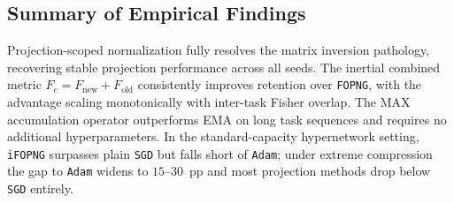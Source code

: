 \subsection*{Summary of Empirical Findings}

Projection-scoped normalization fully resolves the matrix inversion
pathology, recovering stable projection performance across all seeds.
The inertial combined metric $F_c = {F}_{\mathrm{new}} +
{F}_{\mathrm{old}}$ consistently improves retention over
\texttt{FOPNG}, with the advantage scaling monotonically with
inter-task Fisher overlap.
The MAX accumulation operator outperforms EMA on long task sequences
and requires no additional hyperparameters.
In the standard-capacity hypernetwork setting, \texttt{iFOPNG} surpasses
plain \texttt{SGD} but falls short of \texttt{Adam}; under extreme
compression the gap to \texttt{Adam} widens to $15$--$30$~pp and most
projection methods drop below \texttt{SGD} entirely.